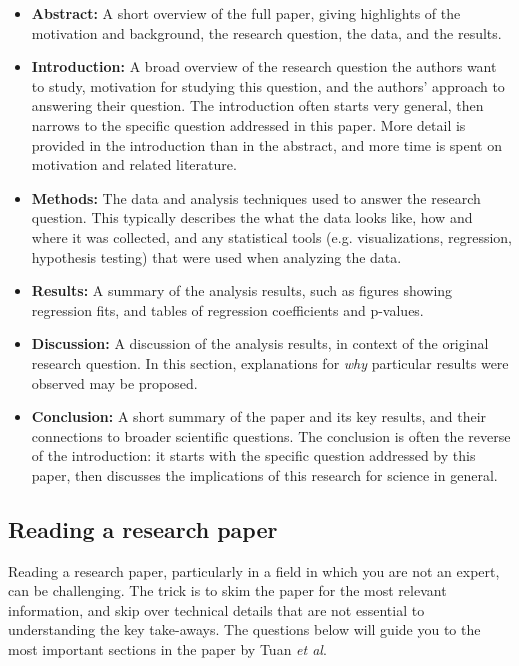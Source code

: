 \documentclass[11pt]{article}
\begin{document}
\begin{itemize}
\item  \textbf{Abstract:} A short overview of the full paper, giving highlights of the motivation and background, the research question, the data, and the results.
\item \textbf{Introduction:} A broad overview of the research question the authors want to study, motivation for studying this question, and the authors' approach to answering their question. The introduction often starts very general, then narrows to the specific question addressed in this paper. More detail is provided in the introduction than in the abstract, and more time is spent on motivation and related literature.
\item \textbf{Methods:} The data and analysis techniques used to answer the research question. This typically describes the what the data looks like, how and where it was collected, and any statistical tools (e.g. visualizations, regression, hypothesis testing) that were used when analyzing the data.
\item \textbf{Results:} A summary of the analysis results, such as figures showing regression fits, and tables of regression coefficients and p-values.
\item \textbf{Discussion:} A discussion of the analysis results, in context of the original research question. In this section, explanations for \textit{why} particular results were observed may be proposed.
\item \textbf{Conclusion:} A short summary of the paper and its key results, and their connections to broader scientific questions. The conclusion is often the reverse of the introduction: it starts with the specific question addressed by this paper, then discusses the implications of this research for science in general.
\end{itemize}



\subsection*{Reading a research paper}

Reading a research paper, particularly in a field in which you are not an expert, can be challenging. The trick is to skim the paper for the most relevant information, and skip over technical details that are not essential to understanding the key take-aways. The questions below will guide you to the most important sections in the paper by Tuan \textit{et al}.
\end{document}
